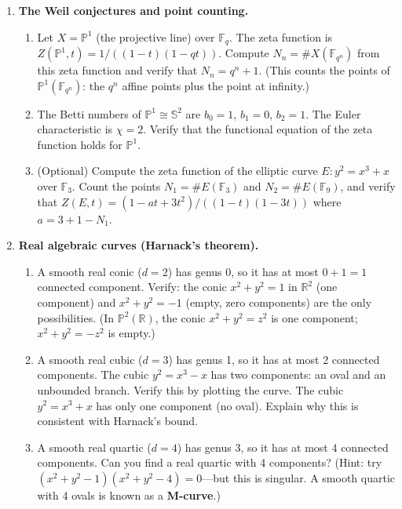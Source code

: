 \begin{enumerate}
    \item[$\star$] \textbf{The Weil conjectures and point counting.}
    \begin{enumerate}
        \item Let $X = \mathbb{P}^1$ (the projective line) over $\mathbb{F}_q$. The zeta function is $Z(\mathbb{P}^1, t) = 1 / ((1-t)(1-qt))$. Compute $N_n = \#X(\mathbb{F}_{q^n})$ from this zeta function and verify that $N_n = q^n + 1$. (This counts the points of $\mathbb{P}^1(\mathbb{F}_{q^n})$: the $q^n$ affine points plus the point at infinity.)
        \item The Betti numbers of $\mathbb{P}^1 \cong \mathbb{S}^2$ are $b_0 = 1$, $b_1 = 0$, $b_2 = 1$. The Euler characteristic is $\chi = 2$. Verify that the functional equation of the zeta function holds for $\mathbb{P}^1$.
        \item (Optional) Compute the zeta function of the elliptic curve $E: y^2 = x^3 + x$ over $\mathbb{F}_3$. Count the points $N_1 = \#E(\mathbb{F}_3)$ and $N_2 = \#E(\mathbb{F}_9)$, and verify that $Z(E, t) = (1 - at + 3t^2) / ((1-t)(1-3t))$ where $a = 3 + 1 - N_1$.
    \end{enumerate}

    \item[$\star$] \textbf{Real algebraic curves (Harnack's theorem).}
    \begin{enumerate}
        \item A smooth real conic ($d = 2$) has genus 0, so it has at most $0 + 1 = 1$ connected component. Verify: the conic $x^2 + y^2 = 1$ in $\mathbb{R}^2$ (one component) and $x^2 + y^2 = -1$ (empty, zero components) are the only possibilities. (In $\mathbb{P}^2(\mathbb{R})$, the conic $x^2 + y^2 = z^2$ is one component; $x^2 + y^2 = -z^2$ is empty.)
        \item A smooth real cubic ($d = 3$) has genus 1, so it has at most 2 connected components. The cubic $y^2 = x^3 - x$ has two components: an oval and an unbounded branch. Verify this by plotting the curve. The cubic $y^2 = x^3 + x$ has only one component (no oval). Explain why this is consistent with Harnack's bound.
        \item A smooth real quartic ($d = 4$) has genus 3, so it has at most 4 connected components. Can you find a real quartic with 4 components? (Hint: try $(x^2 + y^2 - 1)(x^2 + y^2 - 4) = 0$---but this is singular. A smooth quartic with 4 ovals is known as a \textbf{M-curve}.)
    \end{enumerate}

\end{enumerate}
